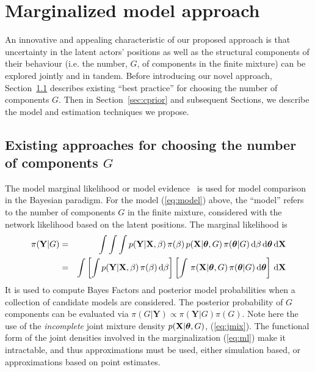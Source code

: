 \documentclass[12pt]{article}
\newcommand{\bX}{{\mathbf{X}}}
\newcommand{\Y}{{\mathbf{Y}}}
\newcommand{\diff}{\mathrm{d}}
\newcommand{\bftheta}{\hbox{\boldmath$\theta$}}
\begin{document}
\section{Marginalized model approach}\label{collapsing}

An innovative and appealing characteristic of our proposed approach is that uncertainty in the latent actors' positions as well as the structural components of their behaviour (i.e. the number, $G$, of components in the  finite mixture) can be explored jointly and in tandem. Before introducing our novel approach, Section~\ref{bicsec} describes existing ``best practice'' for choosing the number of  components $G$. Then in Section~\ref{sec:cprior} and subsequent Sections, we describe the model and estimation techniques we propose.

\subsection{Existing approaches for choosing the number of components $G$} \label{bicsec}

The model marginal likelihood or model evidence~\cite{friel:wyse12} is used for model comparison in the Bayesian paradigm. For the model (\ref{eq:model}) above, the ``model'' refers to the number of components $G$ in the finite mixture, considered with the network likelihood based on the latent positions. The marginal likelihood is 
\begin{eqnarray}
\pi(\Y|G)& = & \int \int \int p(\Y|\bX,\beta)\, \pi( \beta ) \, p( \bX | \bftheta,  G )   \, \pi( \bftheta | G ) \,\diff \beta  \,\diff\bftheta \,\diff \bX \nonumber \\
  & = &\int \left[ \int  p(\Y|\bX,\beta)\, \pi( \beta )  \, \diff \beta \right] \left[\int \, \pi( \bX | \bftheta,  G ) \, \pi( \bftheta | G ) \,\diff\bftheta \right]  \,\diff \bX \label{eq:ml}
\end{eqnarray}
It is used to compute Bayes Factors and posterior model probabilities when a collection of candidate models are considered. The posterior probability of $G$ components can be evaluated via $\pi(G|\Y) \propto \pi(\Y|G)\pi(G)$. Note here the use of the {\it incomplete} joint mixture density $p( \bX | \bftheta,  G )$, (\ref{eq:jmix}). The functional form of the joint densities involved in the marginalization (\ref{eq:ml}) make it intractable, and thus approximations must be used, either simulation based, or approximations based on point estimates.
\end{document}

